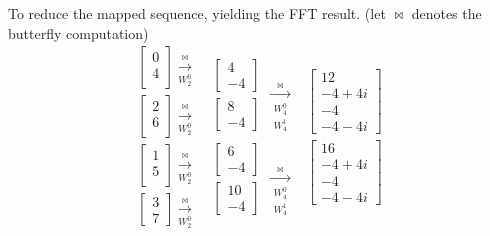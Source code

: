 To reduce the mapped sequence, yielding the FFT result. 
(let $\bowtie$ denotes the butterfly computation)
\[ 
{\substack{
\begin{bmatrix} 0\\ 4\\ \end{bmatrix} \xrightarrow[W_2^0]{\bowtie} \\
\begin{bmatrix} 2\\ 6\\ \end{bmatrix} \xrightarrow[W_2^0]{\bowtie} \\
\begin{bmatrix} 1\\ 5\\ \end{bmatrix} \xrightarrow[W_2^0]{\bowtie} \\
\begin{bmatrix} 3\\ 7 \end{bmatrix} \xrightarrow[W_2^0]{\bowtie}
}}
{\substack{
  {\substack{
\begin{bmatrix} 4\\ -4 \end{bmatrix} \\
\begin{bmatrix} 8\\ -4 \end{bmatrix}
  }}
\xrightarrow[\substack{W_4^0\\W_4^1}]{\bowtie}\\
  {\substack{
\begin{bmatrix} 6\\ -4 \end{bmatrix} \\
\begin{bmatrix} 10\\ -4 \end{bmatrix}
  }}
\xrightarrow[\substack{W_4^0\\W_4^1}]{\bowtie}
}}
{\substack{
\begin{bmatrix} 12 \\ -4 +  4i\\ -4 \\ -4 -  4i \end{bmatrix} \\
\begin{bmatrix} 16 \\ -4 +  4i\\ -4 \\ -4 -  4i \end{bmatrix} }}
\]
